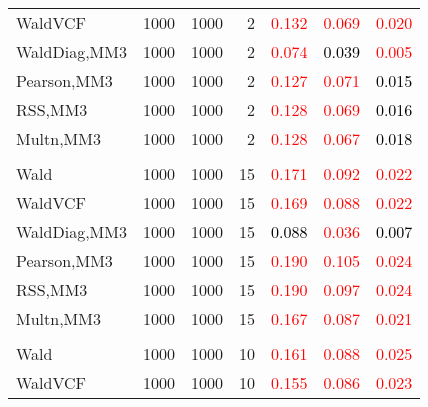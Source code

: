 \documentclass[
]{article}
\begin{document}
\begin{table}[H]
{\begin{tabular}[t]{lrrrrrr}
\hspace{1em}WaldVCF & 1000 & 1000 & 2 & \textcolor{red}{0.132} & \textcolor{red}{0.069} & \textcolor{red}{0.020}\\
\hspace{1em}WaldDiag,MM3 & 1000 & 1000 & 2 & \textcolor{red}{0.074} & \textcolor{black}{0.039} & \textcolor{red}{0.005}\\
\hspace{1em}Pearson,MM3 & 1000 & 1000 & 2 & \textcolor{red}{0.127} & \textcolor{red}{0.071} & \textcolor{black}{0.015}\\
\hspace{1em}RSS,MM3 & 1000 & 1000 & 2 & \textcolor{red}{0.128} & \textcolor{red}{0.069} & \textcolor{black}{0.016}\\
\hspace{1em}Multn,MM3 & 1000 & 1000 & 2 & \textcolor{red}{0.128} & \textcolor{red}{0.067} & \textcolor{black}{0.018}\\
\addlinespace[0.3em]
\multicolumn{7}{l}{\textbf{1F 15V}}\\
\hspace{1em}Wald & 1000 & 1000 & 15 & \textcolor{red}{0.171} & \textcolor{red}{0.092} & \textcolor{red}{0.022}\\
\hspace{1em}WaldVCF & 1000 & 1000 & 15 & \textcolor{red}{0.169} & \textcolor{red}{0.088} & \textcolor{red}{0.022}\\
\hspace{1em}WaldDiag,MM3 & 1000 & 1000 & 15 & \textcolor{black}{0.088} & \textcolor{red}{0.036} & \textcolor{black}{0.007}\\
\hspace{1em}Pearson,MM3 & 1000 & 1000 & 15 & \textcolor{red}{0.190} & \textcolor{red}{0.105} & \textcolor{red}{0.024}\\
\hspace{1em}RSS,MM3 & 1000 & 1000 & 15 & \textcolor{red}{0.190} & \textcolor{red}{0.097} & \textcolor{red}{0.024}\\
\hspace{1em}Multn,MM3 & 1000 & 1000 & 15 & \textcolor{red}{0.167} & \textcolor{red}{0.087} & \textcolor{red}{0.021}\\
\addlinespace[0.3em]
\multicolumn{7}{l}{\textbf{2F 10V}}\\
\hspace{1em}Wald & 1000 & 1000 & 10 & \textcolor{red}{0.161} & \textcolor{red}{0.088} & \textcolor{red}{0.025}\\
\hspace{1em}WaldVCF & 1000 & 1000 & 10 & \textcolor{red}{0.155} & \textcolor{red}{0.086} & \textcolor{red}{0.023}\\

\end{tabular}}
\end{table}
\end{document}
